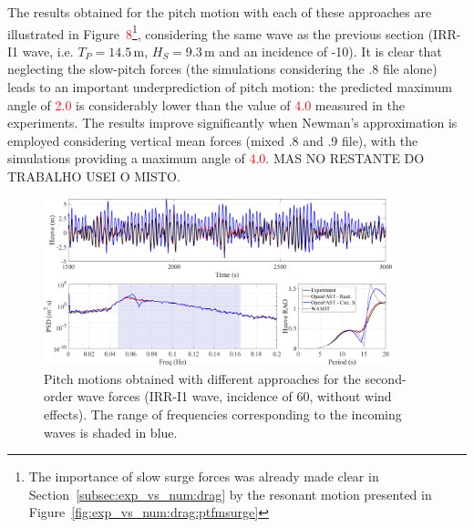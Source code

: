 The results obtained for the pitch motion with each of these approaches are illustrated in Figure~\textcolor{red}{8}\footnote{The importance of slow surge forces was already made clear in Section~\ref{subsec:exp_vs_num:drag} by the resonant motion presented in Figure~\ref{fig:exp_vs_num:drag:ptfmsurge}}, considering the same wave as the previous section (IRR-I1 wave, i.e. $T_P=14.5\,\text{m}$, $H_S=9.3\,\text{m}$ and an incidence of -10\textdegree{}). It is clear that neglecting the slow-pitch forces (the simulations considering the .8 file alone) leads to an important underprediction of pitch motion: the predicted maximum angle of \textcolor{red}{2.0\textdegree{}} is considerably lower than the value of \textcolor{red}{4.0\textdegree{}} measured in the experiments. The results improve significantly when Newman's approximation is employed considering vertical mean forces (mixed .8 and .9 file), with the simulations providing a maximum angle of \textcolor{red}{4.0\textdegree{}}. MAS NO RESTANTE DO TRABALHO USEI O MISTO.

\begin{figure}[!hbtp]
	\centering
	\includegraphics[width=0.9\textwidth]{./figures/ptfmheave-drag_pontoon.png}	
	\caption{Pitch motions obtained with different approaches for the second-order wave forces (IRR-I1 wave, incidence of 60\textdegree{}, without wind effects). The range of frequencies corresponding to the incoming waves is shaded in blue.} \label{fig:exp_vs_num:2ndOrder:ptfmpitch}%
\end{figure}%









